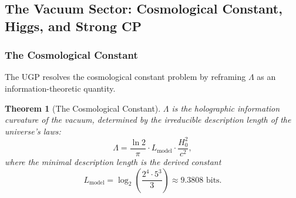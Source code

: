 \documentclass[11pt]{article}
\newtheorem{theorem}{Theorem}[section]
\theoremstyle{remark}
\begin{document}
\subsection{The Vacuum Sector: Cosmological Constant, Higgs, and Strong CP}\label{sec:cosmo_ext}


\subsubsection{The Cosmological Constant}

The UGP resolves the cosmological constant problem by reframing $\Lambda$ as an information-theoretic quantity.

\begin{theorem}[The Cosmological Constant]
\label{thm:lambda}
$\Lambda$ is the holographic information curvature of the vacuum, determined by the irreducible description length of the universe's laws:
\begin{equation}
\Lambda = \frac{\ln 2}{\pi} \cdot L_{\mathrm{model}} \cdot \frac{H_0^2}{c^2},
\label{eq:lambda}
\end{equation}
where the minimal description length is the derived constant
\begin{equation}
L_{\mathrm{model}} = \log_2\!\left(\frac{2^4 \cdot 5^3}{3}\right) \approx 9.3808 \text{ bits}.
\end{equation}
\end{theorem}
\end{document}
